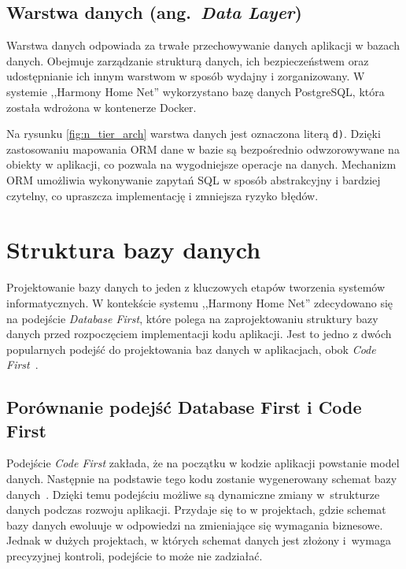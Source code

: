 \subsection{Warstwa danych (ang.\ \emph{Data Layer})}

Warstwa danych odpowiada za trwałe przechowywanie danych aplikacji w bazach danych. Obejmuje zarządzanie strukturą danych, ich bezpieczeństwem oraz udostępnianie ich innym warstwom w sposób wydajny i zorganizowany. W systemie ,,Harmony Home Net'' wykorzystano bazę danych PostgreSQL, która została wdrożona w kontenerze Docker. 

Na rysunku \ref{fig:n_tier_arch} warstwa danych jest oznaczona literą \texttt{d)}. Dzięki zastosowaniu mapowania ORM dane w bazie są bezpośrednio odwzorowywane na obiekty w aplikacji, co pozwala na wygodniejsze operacje na danych. Mechanizm ORM umożliwia wykonywanie zapytań SQL w sposób abstrakcyjny i bardziej czytelny, co upraszcza implementację i zmniejsza ryzyko błędów.


\section{Struktura bazy danych}

Projektowanie bazy danych to jeden z kluczowych etapów tworzenia systemów informatycznych. W kontekście systemu ,,Harmony Home Net'' zdecydowano się na podejście \emph{Database First}, które polega na zaprojektowaniu struktury bazy danych przed rozpoczęciem implementacji kodu aplikacji. Jest to jedno z dwóch popularnych podejść do projektowania baz danych w aplikacjach, obok \emph{Code First}~\cite{DB_FIRST_VS_CODE_FIRST_1,DB_FIRST_VS_CODE_FIRST_2}.

\subsection{Porównanie podejść Database First i Code First}

Podejście \emph{Code First} zakłada, że na początku w kodzie aplikacji powstanie model danych. Następnie na podstawie tego kodu zostanie wygenerowany schemat bazy danych~\cite{CODE_FIRST}. Dzięki temu podejściu możliwe są dynamiczne zmiany w~strukturze danych podczas rozwoju aplikacji. Przydaje się to w projektach, gdzie schemat bazy danych ewoluuje w odpowiedzi na zmieniające się wymagania biznesowe. Jednak w dużych projektach, w których schemat danych jest złożony i~wymaga precyzyjnej kontroli, podejście to może nie zadziałać.

